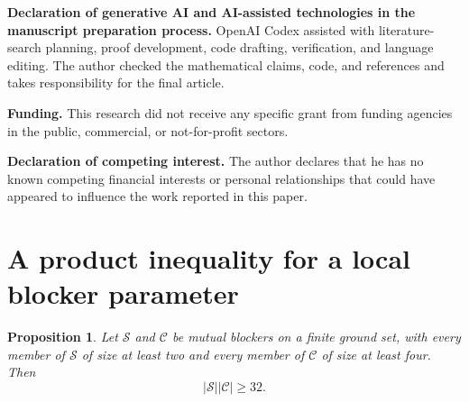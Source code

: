 \documentclass[11pt]{article}
\newtheorem{proposition}[theorem]{Proposition}
\theoremstyle{definition}
\theoremstyle{remark}
\begin{document}
\par\medskip\noindent\textbf{Declaration of generative AI and AI-assisted
technologies in the manuscript preparation process.}\quad
OpenAI Codex assisted with literature-search planning, proof development,
code drafting, verification, and language editing.  The author checked the
mathematical claims, code, and references and takes responsibility for the
final article.

\par\medskip\noindent\textbf{Funding.}\quad
This research did not receive any specific grant from funding agencies in the
public, commercial, or not-for-profit sectors.

\par\medskip\noindent\textbf{Declaration of competing interest.}\quad
The author declares that he has no known competing financial interests or
personal relationships that could have appeared to influence the work
reported in this paper.

\appendix

\section{A product inequality for a local blocker parameter}
\label{app:m24}

\begin{proposition}
\label{prop:m24-product}
Let $\mathcal S$ and $\mathcal C$ be mutual blockers on a finite ground set,
with every member of $\mathcal S$ of size at least two and every member of
$\mathcal C$ of size at least four.  Then
\[
  |\mathcal S||\mathcal C|\geq32.
\]
\end{proposition}
\end{document}
